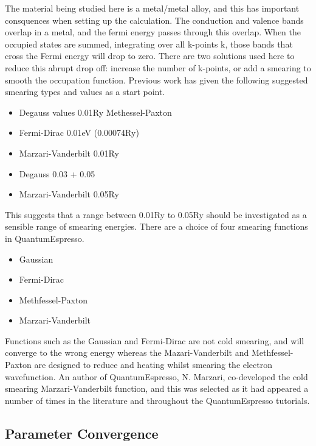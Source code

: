 The material being studied here is a metal/metal alloy, and this has important consquences when setting up the calculation.  The conduction and valence bands overlap in a metal, and the fermi energy passes through this overlap. When the occupied states are summed, integrating over all k-points k\cite{marzarivanderbilt}, those bands that cross the Fermi energy will drop to zero.  There are two solutions used here to reduce this abrupt drop off: increase the number of k-points, or add a smearing to smooth the occupation function.  Previous work has given the following suggested smearing types and values as a start point.

\begin{itemize}
\item Degauss values 0.01Ry Methessel-Paxton \cite{AdsorptionBR2}
\item Fermi-Dirac 0.01eV (0.00074Ry) \cite{NaDiffusion}
\item Marzari-Vanderbilt 0.01Ry \cite{ScBiandYBi}
\item Degauss 0.03 + 0.05 \cite{CuandPd}
\item Marzari-Vanderbilt 0.05Ry \cite{ecHeuslerAlloy}
\end{itemize}

This suggests that a range between 0.01Ry to 0.05Ry should be investigated as a sensible range of smearing energies.  There are a choice of four smearing functions in QuantumEspresso.

\begin{itemize}
\item Gaussian
\item Fermi-Dirac
\item Methfessel-Paxton
\item Marzari-Vanderbilt
\end{itemize}

Functions such as the Gaussian and Fermi-Dirac are not cold smearing, and will converge to the wrong energy whereas the Mazari-Vanderbilt and Methfessel-Paxton are designed to reduce and heating whilst smearing the electron wavefunction.  An author of QuantumEspresso, N. Marzari, co-developed the cold smearing Marzari-Vanderbilt function, and this was selected as it had appeared a number of times in the literature and throughout the QuantumEspresso tutorials.  






\subsection{Parameter Convergence}

